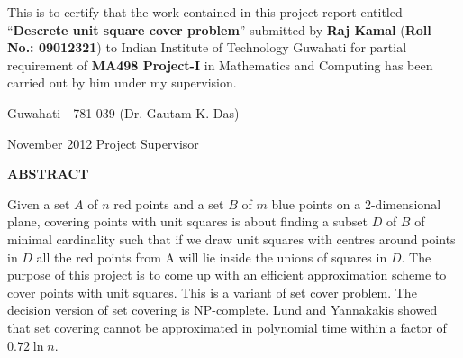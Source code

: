 \documentclass[10pt,a4wide]{report}
\theoremstyle{plain}
\theoremstyle{definition}
\theoremstyle{remark}
\begin{document}
\noindent
This is to certify that the work contained in this project report
entitled ``{\bf Descrete unit square cover problem}'' submitted
by {\bf Raj Kamal} ({\bf Roll No.: 09012321})  to Indian 
Institute of Technology Guwahati for partial requirement of {\bf MA498 Project-I} in Mathematics 
and Computing  has been carried out by him under my supervision.
\vspace{4cm}

\noindent Guwahati - 781 039 \hfill (Dr. Gautam K. Das)

\noindent   November  2012 \hfill  Project Supervisor

\clearpage

\begin{center}
{\Large{\bf{ABSTRACT}}}
\end{center}

Given a set $A$ of $n$ red points and a set $B$ of $m$ blue points on a 2-dimensional plane, 
covering points with unit squares is about finding a subset $D$ of $B$ of minimal cardinality such
that if we draw unit squares with centres around points in $D$ all the red points from A will lie
inside the unions of squares in $D$. The purpose of this project is to come up with an efficient approximation scheme to  
cover points with unit squares. This is a variant of set cover problem. The decision version of set covering is NP-complete. Lund and  Yannakakis \cite{LY94} showed that set covering cannot be 
approximated in polynomial time within a factor of $0.72 \ln n$.
\clearpage
\tableofcontents
\end{document}
